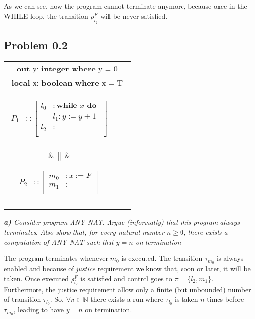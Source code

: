 \documentclass[12pt]{article}
\begin{document}
As we can see, now the program cannot terminate anymore, because once in the WHILE loop, the transition $\rho^F_{\hat{l_2}}$ will be never satisfied.



\subsection*{Problem 0.2}
\begin{center}
\begin{tabular}{|ccc|}
\hline
\multicolumn{3}{|c|}{
\textbf{out} y: \textbf{integer where} y = 0
} \\
\multicolumn{3}{|c|}{
\textbf{local} x: \textbf{boolean where} x = T
} \\
\parbox{4cm}{\begin{align*}
      P_1 &:: \left[ \begin{aligned}
 		l_0 &: \textbf{while }x \textbf{ do } \\ 
 			& l_1: y:= y+1\\
 		l_2 &: \\
		\end{aligned} \right]\\
   \end{align*}}
   &
	$\big{\|}$   
   &
   \parbox{4cm}{\begin{align*}
      P_2 &:: \left[ \begin{aligned}
 		m_0 &: x := F \\
 		m_1 &: \\
		\end{aligned} \right]\\
   \end{align*}}\\
    \\\hline
\end{tabular}
\end{center}



\textit{\textbf{a)} Consider program ANY-NAT. Argue (informally) that this program always terminates. Also show that, for every natural number $n \geq 0$,
there exists a computation of ANY-NAT such that $y = n$ on termination.}

\medskip
The program terminates whenever $m_0$ is executed. The transition $\tau_{m_0}$ is always enabled and because of \textit{justice} requirement we know that, soon or later, it will be taken. Once executed $\rho^F_{l_0}$ is satisfied and control goes to $\pi = \{l_2,m_1\}$.
Furthermore, the justice requirement allow only a finite (but unbounded) number of transition $\tau_{l_0}$. So, $\forall n \in \mathbb{N}$ there exists a run where $\tau_{l_0}$ is taken $n$ times before $\tau_{m_0}$, leading to have $y=n$ on termination.
\end{document}
